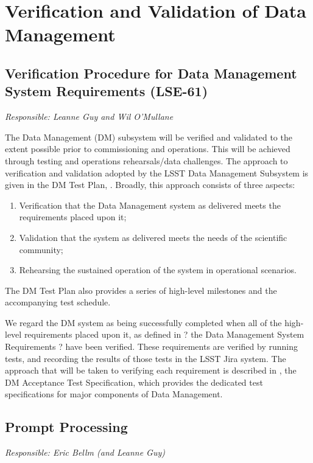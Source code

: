 \section{Verification and Validation of Data Management}  \label{sec:dm}

\subsection{Verification Procedure for Data Management System Requirements (LSE-61)}
{\it Responsible: Leanne Guy and Wil O'Mullane}

The Data Management (DM) subsystem will be verified and validated to the extent possible prior to commissioning and operations. 
This will be achieved through testing and operations rehearsals/data challenges. 
The approach to verification and validation adopted by the LSST Data Management Subsystem is given in the DM Test Plan, . 
Broadly, this approach consists of three aspects:
\begin{enumerate}
\item Verification that the Data Management system as delivered meets the requirements placed upon it;
\item Validation that the system as delivered meets the needs of the scientific community;
\item Rehearsing the sustained operation of the system in operational scenarios.
\end{enumerate}
The DM Test Plan also provides a series of high-level milestones and the accompanying test schedule. 

We regard the DM system as being successfully completed when all of the high-level requirements placed upon it, as defined in \cite{LSE-61} ? the Data Management System Requirements ? have been verified. 
These requirements are verified by running tests, and recording the results of those tests in the LSST Jira system. 
The approach that will be taken to verifying each requirement is described in  , the DM Acceptance Test Specification, which provides the dedicated test specifications for major components of Data Management.


\subsection{Prompt Processing}
{\it Responsible: Eric Bellm (and Leanne Guy)}

